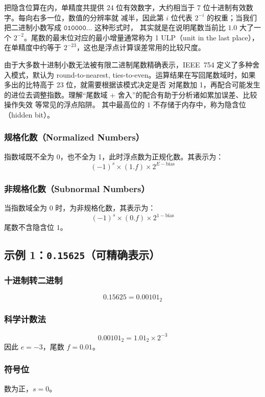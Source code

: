 把隐含位算在内，单精度共提供 24 位有效数字，大约相当于 7 位十进制有效数字。每向右多一位，数值的分辨率就
减半，因此第 $i$ 位代表 $2^{-i}$ 的权重；当我们把二进制小数写成 $\texttt{010000...}$ 这种形式时，
其实就是在说明尾数当前比 $1.0$ 大了一个 $2^{-2}$。尾数的最末位对应的最小增量通常称为 1 ULP（unit in the
last place），在单精度中约等于 $2^{-23}$，这也是浮点计算误差常用的比较尺度。

由于大多数十进制小数无法被有限二进制尾数精确表示，IEEE~754 定义了多种舍入模式，默认为
round-to-nearest, ties-to-even。运算结果在写回尾数域时，如果多出的比特高于 23 位，就需要根据该模式决定是否
对尾数加 1，再配合可能发生的进位去调整指数。理解“尾数域 + 舍入”的配合有助于分析诸如累加误差、比较操作失效
等常见的浮点陷阱。
其中最高位的 $1$ 不存储于内存中，称为隐含位（hidden bit）。

\subsubsection{规格化数（Normalized Numbers）}

指数域既不全为 0，也不全为 1，此时浮点数为正规化数。其表示为：
\[
(-1)^s \times (1.f) \times 2^{E - \mathrm{bias}}
\]

\subsubsection{非规格化数（Subnormal Numbers）}

当指数域全为 0 时，为非规格化数，其表示为：
\[
(-1)^s \times (0.f) \times 2^{1-\mathrm{bias}}
\]
尾数不含隐含位 $1$。

\subsection{示例 1：\texttt{0.15625}（可精确表示）}

\subsubsection*{十进制转二进制}
\[
0.15625 = 0.00101_2
\]

\subsubsection*{科学计数法}
\[
0.00101_2 = 1.01_2 \times 2^{-3}
\]
因此 $e=-3$，尾数 $f=0.01$。

\subsubsection*{符号位}
数为正，$s = 0$。

